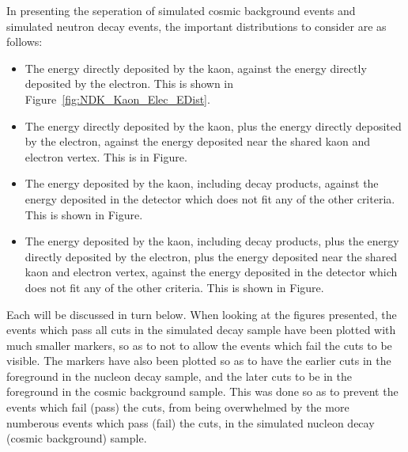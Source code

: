 In presenting the seperation of simulated cosmic background events and simulated neutron decay events, the important distributions to consider are as follows:
\begin{itemize}
\item The energy directly deposited by the kaon, against the energy directly deposited by the electron. This is shown in Figure~\ref{fig:NDK_Kaon_Elec_EDist}.
\item The energy directly deposited by the kaon, plus the energy directly deposited by the electron, against the energy deposited near the shared kaon and electron vertex. This is in Figure.
\item The energy deposited by the kaon, including decay products, against the energy deposited in the detector which does not fit any of the other criteria. This is shown in Figure.
\item The energy deposited by the kaon, including decay products, plus the energy directly deposited by the electron, plus the energy deposited near the shared kaon and electron vertex, against the energy deposited in the detector which does not fit any of the other criteria. This is shown in Figure.
\end{itemize}
Each will be discussed in turn below. When looking at the figures presented, the events which pass all cuts in the simulated decay sample have been plotted with much smaller markers, so as to not to allow the events which fail the cuts to be visible. The markers have also been plotted so as to have the earlier cuts in the foreground in the nucleon decay sample, and the later cuts to be in the foreground in the cosmic background sample. This was done so as to prevent the events which fail (pass) the cuts, from being overwhelmed by the more numberous events which pass (fail) the cuts, in the simulated nucleon decay (cosmic background) sample. \\

